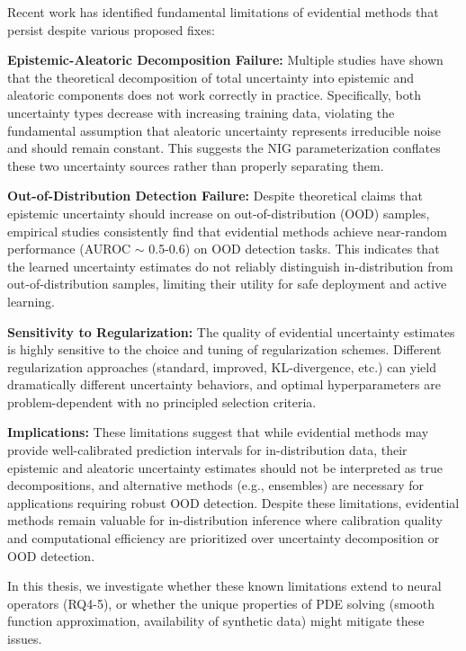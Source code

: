 Recent work has identified fundamental limitations of evidential methods that persist despite various proposed fixes:

\textbf{Epistemic-Aleatoric Decomposition Failure:} Multiple studies \cite{jurgens2024epistemic,ulmer2024prior,bickford2024rethinking} have shown that the theoretical decomposition of total uncertainty into epistemic and aleatoric components does not work correctly in practice. Specifically, both uncertainty types decrease with increasing training data, violating the fundamental assumption that aleatoric uncertainty represents irreducible noise and should remain constant. This suggests the NIG parameterization conflates these two uncertainty sources rather than properly separating them.

\textbf{Out-of-Distribution Detection Failure:} Despite theoretical claims that epistemic uncertainty should increase on out-of-distribution (OOD) samples, empirical studies \cite{meinke2024uncertaintyquantification,hullermeier2021aleatoric,piao2025evidential} consistently find that evidential methods achieve near-random performance (AUROC $\sim$ 0.5-0.6) on OOD detection tasks. This indicates that the learned uncertainty estimates do not reliably distinguish in-distribution from out-of-distribution samples, limiting their utility for safe deployment and active learning.

\textbf{Sensitivity to Regularization:} The quality of evidential uncertainty estimates is highly sensitive to the choice and tuning of regularization schemes. Different regularization approaches (standard, improved, KL-divergence, etc.) can yield dramatically different uncertainty behaviors, and optimal hyperparameters are problem-dependent with no principled selection criteria.

\textbf{Implications:} These limitations suggest that while evidential methods may provide well-calibrated prediction intervals for in-distribution data, their epistemic and aleatoric uncertainty estimates should not be interpreted as true decompositions, and alternative methods (e.g., ensembles) are necessary for applications requiring robust OOD detection. Despite these limitations, evidential methods remain valuable for in-distribution inference where calibration quality and computational efficiency are prioritized over uncertainty decomposition or OOD detection.

In this thesis, we investigate whether these known limitations extend to neural operators (RQ4-5), or whether the unique properties of PDE solving (smooth function approximation, availability of synthetic data) might mitigate these issues.

